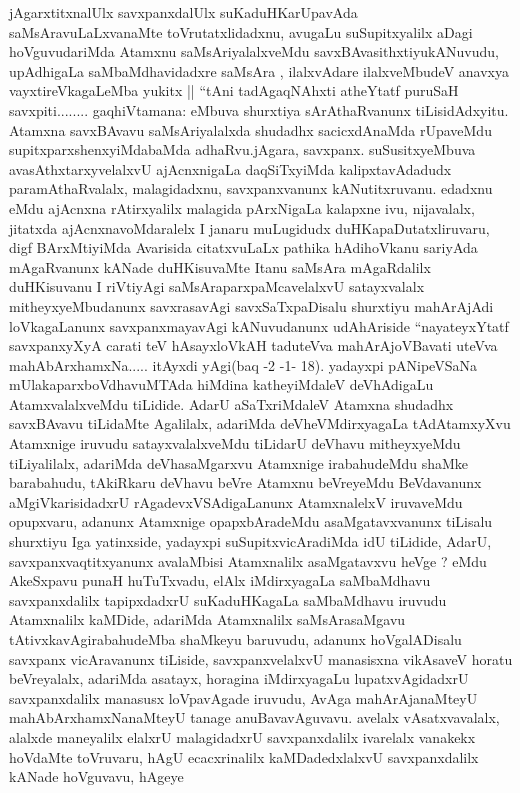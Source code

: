 \begin{artha}
jAgarxtitxnalUlx savxpanxdalUlx suKaduHKarUpavAda saMsAravuLaLxvanaMte
toVrutatxlidadxnu, avugaLu suSupitxyalilx aDagi hoVguvudariMda Atamxnu
saMsAriyalalxveMdu savxBAvasithxtiyukANuvudu, upAdhigaLa
saMbaMdhavidadxre saMsAra , ilalxvAdare ilalxveMbudeV anavxya
vayxtireVkagaLeMba yukitx || ``tAni tadAgaqNAhxti atheYtatf puruSaH
savxpiti........ gaqhiVtamana: eMbuva shurxtiya sArAthaRvanunx
tiLisidAdxyitu. Atamxna savxBAvavu saMsAriyalalxda shudadhx
sacicxdAnaMda rUpaveMdu supitxparxshenxyiMdabaMda adhaRvu.jAgara,
savxpanx. suSusitxyeMbuva avasAthxtarxyvelalxvU ajAcnxnigaLa
daqSiTxyiMda kalipxtavAdadudx paramAthaRvalalx, malagidadxnu,
savxpanxvanunx kANutitxruvanu. edadxnu eMdu ajAcnxna rAtirxyalilx malagida
pArxNigaLa kalapxne ivu, nijavalalx, jitatxda ajAcnxnavoMdaralelx I
janaru muLugidudx duHKapaDutatxliruvaru, digf BArxMtiyiMda Avarisida
citatxvuLaLx pathika hAdihoVkanu sariyAda mAgaRvanunx kANade
duHKisuvaMte Itanu saMsAra mAgaRdalilx duHKisuvanu I riVtiyAgi
saMsAraparxpaMcavelalxvU satayxvalalx mitheyxyeMbudanunx savxrasavAgi
savxSaTxpaDisalu shurxtiyu mahArAjAdi loVkagaLanunx savxpanxmayavAgi
kANuvudanunx udAhAriside ``nayateyxYtatf savxpanxyXyA carati teV
hAsayxloVkAH taduteVva mahArAjoVBavati uteVva
mahAbArxhamxNa..... itAyxdi yAgi(baq -2 -1- 18). yadayxpi pANipeVSaNa
mUlakaparxboVdhavuMTAda hiMdina katheyiMdaleV deVhAdigaLu
AtamxvalalxveMdu tiLidide. AdarU aSaTxriMdaleV Atamxna shudadhx
savxBAvavu tiLidaMte Agalilalx, adariMda deVheVMdirxyagaLa tAdAtamxyXvu
Atamxnige iruvudu satayxvalalxveMdu tiLidarU deVhavu mitheyxyeMdu
tiLiyalilalx, adariMda deVhasaMgarxvu Atamxnige irabahudeMdu shaMke
barabahudu, tAkiRkaru deVhavu beVre Atamxnu beVreyeMdu BeVdavanunx
aMgiVkarisidadxrU rAgadevxVSAdigaLanunx AtamxnalelxV iruvaveMdu
opupxvaru, adanunx Atamxnige opapxbAradeMdu asaMgatavxvanunx tiLisalu
shurxtiyu Iga yatinxside, yadayxpi suSupitxvicAradiMda idU tiLidide,
AdarU, savxpanxvaqtitxyanunx avalaMbisi Atamxnalilx asaMgatavxvu heVge
? eMdu AkeSxpavu punaH huTuTxvadu, elAlx iMdirxyagaLa saMbaMdhavu
savxpanxdalilx tapipxdadxrU suKaduHKagaLa saMbaMdhavu iruvudu
Atamxnalilx kaMDide, adariMda Atamxnalilx saMsArasaMgavu
tAtivxkavAgirabahudeMba shaMkeyu baruvudu, adanunx hoVgalADisalu
savxpanx vicAravanunx tiLiside, savxpanxvelalxvU manasisxna vikAsaveV
horatu beVreyalalx, adariMda asatayx, horagina iMdirxyagaLu
lupatxvAgidadxrU savxpanxdalilx manasusx loVpavAgade iruvudu, AvAga
mahArAjanaMteyU mahAbArxhamxNanaMteyU tanage anuBavavAguvavu. avelalx
vAsatxvavalalx, alalxde maneyalilx elalxrU malagidadxrU
savxpanxdalilx ivarelalx vanakekx hoVdaMte toVruvaru, hAgU
ecacxrinalilx kaMDadedxlalxvU savxpanxdalilx kANade hoVguvavu, hAgeye

\end{artha}
